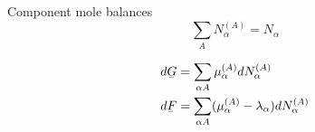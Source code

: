 \documentclass[12pt]{article}
\begin{document}
Component mole balances
\begin{equation}
\sum_A  N_\alpha^{(A)} = N_\alpha
\end{equation}

\begin{align*}
d\underaccent{\bar}{G} &= \sum_{\alpha A}  \mu_\alpha^{(A)}  dN_\alpha^{(A)}
\\
d \underaccent{\bar}{F} 
&= \sum_{\alpha A}  (\mu_\alpha^{(A)}- \lambda_\alpha) dN_\alpha^{(A)}
\end{align*}



\end{document}
